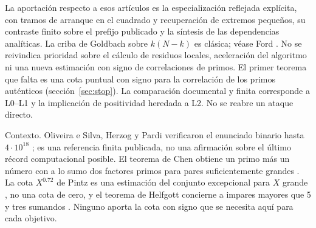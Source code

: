 \documentclass[11pt,a4paper]{article}
\newcommand{\B}[2]{#2}
\newcommand{\B}[2]{#1}
\begin{document}
\B{Our contribution relative to those papers is the explicit reflected specialization, including the square-start intervals and the restoration of small endpoints, its finite cross-check at the published prefix, and a synthesis of the analytical dependencies. The underlying Goldbach sieve on $k(N-k)$ is classical; see Ford \cite[§1.2]{ford}. We claim no priority for the local residue calculation, no speedup, and no new signed prime-correlation estimate. The first missing theorem is a signed pointwise bound for the actual prime correlation (Section~\ref{sec:stop}). The documentary and finite comparison is at levels L0--L1; the inherited positivity implication is L2. No direct proof stage is reopened.}{La aportación respecto a esos artículos es la especialización reflejada explícita, con tramos de arranque en el cuadrado y recuperación de extremos pequeños, su contraste finito sobre el prefijo publicado y la síntesis de las dependencias analíticas. La criba de Goldbach sobre $k(N-k)$ es clásica; véase Ford \cite[§1.2]{ford}. No se reivindica prioridad sobre el cálculo de residuos locales, aceleración del algoritmo ni una nueva estimación con signo de correlaciones de primos. El primer teorema que falta es una cota puntual con signo para la correlación de los primos auténticos (sección~\ref{sec:stop}). La comparación documental y finita corresponde a L0--L1 y la implicación de positividad heredada a L2. No se reabre un ataque directo.}

\B{Background. Oliveira e Silva, Herzog and Pardi verified the binary statement through $4\cdot10^{18}$ \cite{verify}; that is a published finite baseline, not a claim about the latest possible computational record. Chen's theorem gives a prime plus a number with at most two prime factors for sufficiently large even integers \cite{chen}. Pintz's $X^{0.72}$ bound is an exceptional-set estimate for large $X$ \cite{pintz}, not a bound of zero, and Helfgott's theorem concerns odd integers greater than 5 and three summands \cite{helfgott}. None supplies the signed bound for every target needed below.}{Contexto. Oliveira e Silva, Herzog y Pardi verificaron el enunciado binario hasta $4\cdot10^{18}$ \cite{verify}; es una referencia finita publicada, no una afirmación sobre el último récord computacional posible. El teorema de Chen obtiene un primo más un número con a lo sumo dos factores primos para pares suficientemente grandes \cite{chen}. La cota $X^{0.72}$ de Pintz es una estimación del conjunto excepcional para $X$ grande \cite{pintz}, no una cota de cero, y el teorema de Helfgott concierne a impares mayores que 5 y tres sumandos \cite{helfgott}. Ninguno aporta la cota con signo que se necesita aquí para cada objetivo.}
\end{document}
